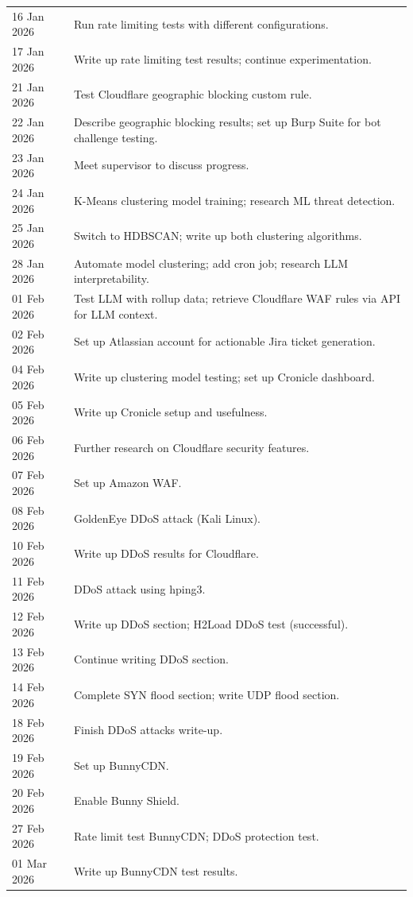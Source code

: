 \documentclass[12pt, a4paper]{report}   %
\begin{document}
\begin{longtable}{p{3cm} p{11cm}}
  16 Jan 2026  & Run rate limiting tests with different configurations. \\
  17 Jan 2026  & Write up rate limiting test results; continue experimentation. \\
  21 Jan 2026  & Test Cloudflare geographic blocking custom rule. \\
  22 Jan 2026  & Describe geographic blocking results; set up Burp Suite for bot challenge testing. \\
  23 Jan 2026  & Meet supervisor to discuss progress. \\
  24 Jan 2026  & K-Means clustering model training; research ML threat detection. \\
  25 Jan 2026  & Switch to HDBSCAN; write up both clustering algorithms. \\
  28 Jan 2026  & Automate model clustering; add cron job; research LLM interpretability. \\
  01 Feb 2026  & Test LLM with rollup data; retrieve Cloudflare WAF rules via API for LLM context. \\
  02 Feb 2026  & Set up Atlassian account for actionable Jira ticket generation. \\
  04 Feb 2026  & Write up clustering model testing; set up Cronicle dashboard. \\
  05 Feb 2026  & Write up Cronicle setup and usefulness. \\
  06 Feb 2026  & Further research on Cloudflare security features. \\
  07 Feb 2026  & Set up Amazon WAF. \\
  08 Feb 2026  & GoldenEye DDoS attack (Kali Linux). \\
  10 Feb 2026  & Write up DDoS results for Cloudflare. \\
  11 Feb 2026  & DDoS attack using hping3. \\
  12 Feb 2026  & Write up DDoS section; H2Load DDoS test (successful). \\
  13 Feb 2026  & Continue writing DDoS section. \\
  14 Feb 2026  & Complete SYN flood section; write UDP flood section. \\
  18 Feb 2026  & Finish DDoS attacks write-up. \\
  19 Feb 2026  & Set up BunnyCDN. \\
  20 Feb 2026  & Enable Bunny Shield. \\
  27 Feb 2026  & Rate limit test BunnyCDN; DDoS protection test. \\
  01 Mar 2026  & Write up BunnyCDN test results. \\

\end{longtable}
\end{document}
